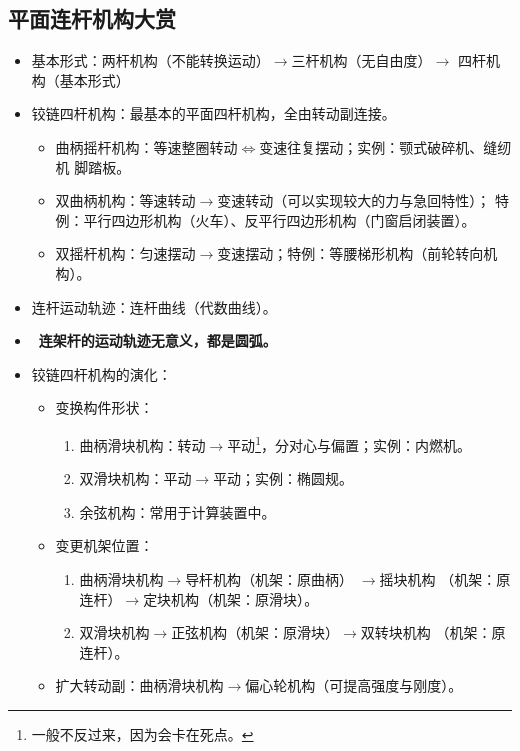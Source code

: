 \documentclass[12pt,a4paper]{article}
\newcommand{\tightlist}{\setlength{\parskip}{0pt}\setlength{\itemsep}{0pt}}
\newcommand{\hint}[1]{\textsf{（#1）}}
\newcommand{\minor}[1]{{\color{gray} #1}}
\newcommand{\then}{$\to$}
\newcommand{\equv}{$\Leftrightarrow$}
\renewcommand{\emph}[1]{\faIcon[regular]{lightbulb}\ \textbf{#1}}
\begin{document}
\subsection{平面连杆机构大赏}
\begin{itemize}\tightlist
    \item 基本形式：两杆机构\hint{不能转换运动}\then 三杆机构\hint{无自由度}\then
    四杆机构\hint{基本形式}
    \item 铰链四杆机构：最基本的平面四杆机构，全由转动副连接。
    \begin{itemize}\tightlist
        \item 曲柄摇杆机构：等速整圈转动\equv 变速往复摆动；实例：颚式破碎机、缝纫机
        脚踏板。
        \item 双曲柄机构：等速转动\then 变速转动\hint{可以实现较大的力与急回特性}；
        特例：平行四边形机构\hint{火车}、反平行四边形机构\hint{门窗启闭装置}。
        \item 双摇杆机构：匀速摆动\then 变速摆动；特例：等腰梯形机构\hint{前轮转向机构}。
    \end{itemize}
    \item 连杆运动轨迹：连杆曲线\hint{代数曲线}。
    \item \emph{连架杆的运动轨迹无意义，都是圆弧。}
    \item 铰链四杆机构的演化：
    \begin{itemize}\tightlist
        \item 变换构件形状：
        \begin{enumerate}\tightlist
            \item 曲柄滑块机构：转动\then 平动\footnote{一般不反过来，因为会卡在死点。
            }，分对心与偏置；实例：内燃机。
            \item 双滑块机构：平动\then 平动；实例：椭圆规。
            \item \minor{余弦机构：常用于计算装置中。}
        \end{enumerate}
        \item 变更机架位置：
        \begin{enumerate}\tightlist
            \item 曲柄滑块机构\then 导杆机构\hint{机架：原曲柄}\minor{\then 摇块机构
            \hint{机架：原连杆}\then 定块机构\hint{机架：原滑块}}。
            \item \minor{双滑块机构\then 正弦机构\hint{机架：原滑块}\then 双转块机构
            \hint{机架：原连杆}。}
        \end{enumerate}
        \item 扩大转动副：曲柄滑块机构\then 偏心轮机构\hint{可提高强度与刚度}。
    \end{itemize}
\end{itemize}
\end{document}
